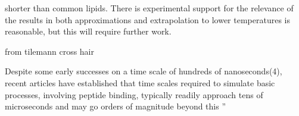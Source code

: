  shorter than common lipids. There is experimental support for the relevance of the results in both approximations and extrapolation to lower temperatures is reasonable, but this will require further work.


from tilemann cross hair

Despite some early successes on a time scale of hundreds of nanoseconds(4), recent articles have established that time scales required to simulate basic  processes,  involving  peptide binding,  typically  readily  approach tens of microseconds and may go orders of magnitude beyond this
''

